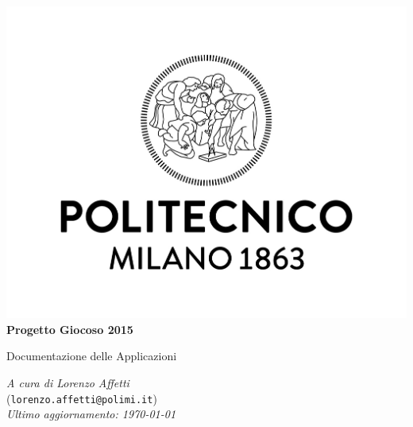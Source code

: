\begin{titlepage}
\begin{center}
\includegraphics[width=\textwidth]{polimi_logo.jpg}
\Huge
\textbf{Progetto Giocoso 2015}

Documentazione delle Applicazioni

\vspace{3cm}
\normalsize
\Large \textit{A cura di Lorenzo Affetti}\\
\large (\texttt{lorenzo.affetti@polimi.it})\\
\textit{Ultimo aggiornamento: \today}
\end{center}
\end{titlepage}
